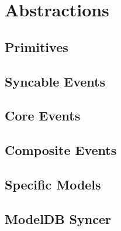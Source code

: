 \chapter{Abstractions}

\section{Primitives}

\section{Syncable Events}

\section{Core Events}

\section{Composite Events}

\section{Specific Models}

\section{ModelDB Syncer}
